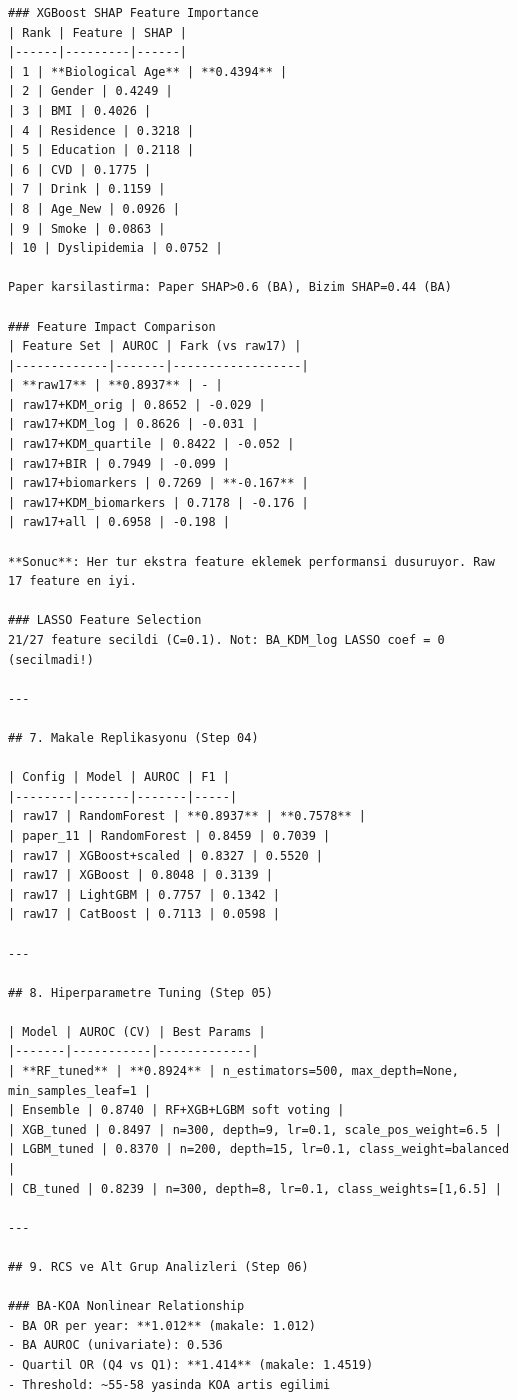 ﻿\documentclass[11pt,a4paper]{article}
\begin{document}
\begin{verbatim}
### XGBoost SHAP Feature Importance
| Rank | Feature | SHAP |
|------|---------|------|
| 1 | **Biological Age** | **0.4394** |
| 2 | Gender | 0.4249 |
| 3 | BMI | 0.4026 |
| 4 | Residence | 0.3218 |
| 5 | Education | 0.2118 |
| 6 | CVD | 0.1775 |
| 7 | Drink | 0.1159 |
| 8 | Age_New | 0.0926 |
| 9 | Smoke | 0.0863 |
| 10 | Dyslipidemia | 0.0752 |

Paper karsilastirma: Paper SHAP>0.6 (BA), Bizim SHAP=0.44 (BA)

### Feature Impact Comparison
| Feature Set | AUROC | Fark (vs raw17) |
|-------------|-------|------------------|
| **raw17** | **0.8937** | - |
| raw17+KDM_orig | 0.8652 | -0.029 |
| raw17+KDM_log | 0.8626 | -0.031 |
| raw17+KDM_quartile | 0.8422 | -0.052 |
| raw17+BIR | 0.7949 | -0.099 |
| raw17+biomarkers | 0.7269 | **-0.167** |
| raw17+KDM_biomarkers | 0.7178 | -0.176 |
| raw17+all | 0.6958 | -0.198 |

**Sonuc**: Her tur ekstra feature eklemek performansi dusuruyor. Raw 17 feature en iyi.

### LASSO Feature Selection
21/27 feature secildi (C=0.1). Not: BA_KDM_log LASSO coef = 0 (secilmadi!)

---

## 7. Makale Replikasyonu (Step 04)

| Config | Model | AUROC | F1 |
|--------|-------|-------|-----|
| raw17 | RandomForest | **0.8937** | **0.7578** |
| paper_11 | RandomForest | 0.8459 | 0.7039 |
| raw17 | XGBoost+scaled | 0.8327 | 0.5520 |
| raw17 | XGBoost | 0.8048 | 0.3139 |
| raw17 | LightGBM | 0.7757 | 0.1342 |
| raw17 | CatBoost | 0.7113 | 0.0598 |

---

## 8. Hiperparametre Tuning (Step 05)

| Model | AUROC (CV) | Best Params |
|-------|-----------|-------------|
| **RF_tuned** | **0.8924** | n_estimators=500, max_depth=None, min_samples_leaf=1 |
| Ensemble | 0.8740 | RF+XGB+LGBM soft voting |
| XGB_tuned | 0.8497 | n=300, depth=9, lr=0.1, scale_pos_weight=6.5 |
| LGBM_tuned | 0.8370 | n=200, depth=15, lr=0.1, class_weight=balanced |
| CB_tuned | 0.8239 | n=300, depth=8, lr=0.1, class_weights=[1,6.5] |

---

## 9. RCS ve Alt Grup Analizleri (Step 06)

### BA-KOA Nonlinear Relationship
- BA OR per year: **1.012** (makale: 1.012)
- BA AUROC (univariate): 0.536
- Quartil OR (Q4 vs Q1): **1.414** (makale: 1.4519)
- Threshold: ~55-58 yasinda KOA artis egilimi


\end{verbatim}
\end{document}
